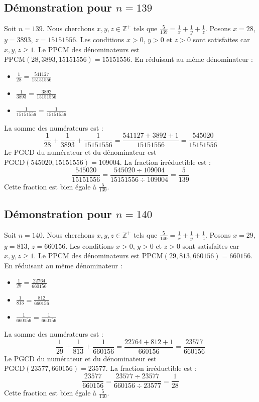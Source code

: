 \documentclass[11pt,a4paper]{article}
\begin{document}
\subsection{Démonstration pour $n = 139$}
Soit $n = 139$. Nous cherchons $x, y, z \in \mathbb{Z}^{+}$ tels que $\frac{5}{139} = \frac{1}{x} + \frac{1}{y} + \frac{1}{z}$.
Posons $x = 28$, $y = 3893$, $z = 15151556$.
Les conditions $x > 0$, $y > 0$ et $z > 0$ sont satisfaites car $x, y, z \geq 1$.
Le PPCM des dénominateurs est $\text{PPCM}(28, 3893, 15151556) = 15151556$.
En réduisant au même dénominateur :
\begin{itemize}
    \item $\frac{1}{28} = \frac{541127}{15151556}$
    \item $\frac{1}{3893} = \frac{3892}{15151556}$
    \item $\frac{1}{15151556} = \frac{1}{15151556}$
\end{itemize}
La somme des numérateurs est :
$$ \frac{1}{28} + \frac{1}{3893} + \frac{1}{15151556} = \frac{541127 + 3892 + 1}{15151556} = \frac{545020}{15151556} $$
Le PGCD du numérateur et du dénominateur est $\text{PGCD}(545020, 15151556) = 109004$.
La fraction irréductible est :
$$ \frac{545020}{15151556} = \frac{545020 \div 109004}{15151556 \div 109004} = \frac{5}{139} $$
Cette fraction est bien égale à $\frac{5}{139}$.

\subsection{Démonstration pour $n = 140$}
Soit $n = 140$. Nous cherchons $x, y, z \in \mathbb{Z}^{+}$ tels que $\frac{5}{140} = \frac{1}{x} + \frac{1}{y} + \frac{1}{z}$.
Posons $x = 29$, $y = 813$, $z = 660156$.
Les conditions $x > 0$, $y > 0$ et $z > 0$ sont satisfaites car $x, y, z \geq 1$.
Le PPCM des dénominateurs est $\text{PPCM}(29, 813, 660156) = 660156$.
En réduisant au même dénominateur :
\begin{itemize}
    \item $\frac{1}{29} = \frac{22764}{660156}$
    \item $\frac{1}{813} = \frac{812}{660156}$
    \item $\frac{1}{660156} = \frac{1}{660156}$
\end{itemize}
La somme des numérateurs est :
$$ \frac{1}{29} + \frac{1}{813} + \frac{1}{660156} = \frac{22764 + 812 + 1}{660156} = \frac{23577}{660156} $$
Le PGCD du numérateur et du dénominateur est $\text{PGCD}(23577, 660156) = 23577$.
La fraction irréductible est :
$$ \frac{23577}{660156} = \frac{23577 \div 23577}{660156 \div 23577} = \frac{1}{28} $$
Cette fraction est bien égale à $\frac{5}{140}$.
\end{document}
